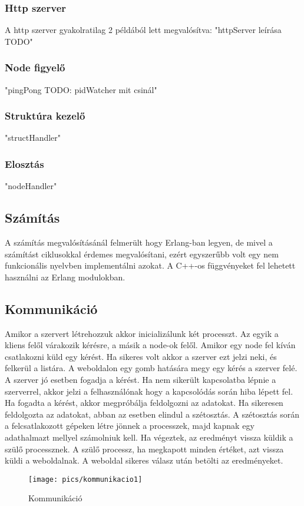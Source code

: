 	\subsubsection{Http szerver}
	A http szerver gyakolratilag 2 példából lett megvalósítva:
	"httpServer leírása TODO"
	\subsubsection{Node figyelő}
	"pingPong TODO: pidWatcher mit csinál"
	\subsubsection{Struktúra kezelő}
	"structHandler"
	\subsubsection{Elosztás}
	"nodeHandler"

\subsection{Számítás}
	A számítás megvalósításánál felmerült hogy Erlang-ban legyen, de mivel a számítást ciklusokkal érdemes megvalósítani, ezért egyszerűbb volt egy nem funkcionális nyelvben implementálni azokat.
	A C++-os függvényeket fel lehetett használni az Erlang modulokban.
	\newline


\subsection{Kommunikáció}
	Amikor a szervert létrehozzuk akkor inicializálunk két processzt. Az egyik a kliens felől várakozik kérésre, a másik a node-ok felől. Amikor egy node fel kíván csatlakozni küld egy kérést. Ha sikeres volt akkor a szerver ezt jelzi neki, és felkerül a listára. \newline
	A weboldalon egy gomb hatására megy egy kérés a szerver felé. A szerver jó esetben fogadja a kérést. Ha nem sikerült kapcsolatba lépnie a szerverrel, akkor jelzi a felhasználónak hogy a kapcsolódás során hiba lépett fel. \newline
	Ha fogadta a kérést, akkor megpróbálja feldolgozni az adatokat. Ha sikeresen feldolgozta az adatokat, abban az esetben elindul a szétosztás. \newline
	A szétosztás során a felcsatlakozott gépeken létre jönnek a processzek, majd kapnak egy adathalmazt mellyel számolniuk kell. Ha végeztek, az eredményt vissza küldik a szülő processznek. A szülő processz, ha megkapott minden értéket, azt vissza küldi a weboldalnak.
	\newline
	A weboldal sikeres válasz után betölti az eredményeket. 
	\begin{figure}[h]
		\texttt{[image: pics/kommunikacio1]}
	\centering
	\caption{Kommunikáció\label{fig:kommunikacio1}}
	\end{figure}

